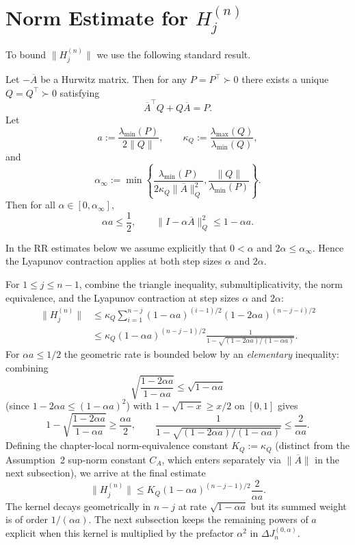 \section{\texorpdfstring{Norm Estimate for $H_j^{(n)}$}{Norm Estimate for H}}

To bound $\lVert H_j^{(n)}\rVert$ we use the following standard result.

\begin{lemma}
  \label{lem:lyapunov-contraction-local}
  Let $-\overline{A}$ be a Hurwitz matrix. Then for any
  $P=P^\top\succ0$ there exists a unique $Q=Q^\top\succ0$ satisfying
  \[
    \overline{A}^\top Q+Q\overline{A}=P.
  \]
  Let
  \[
    a:=\frac{\lambda_{\min}(P)}{2\lVert Q\rVert},
    \qquad
    \kappa_Q:=\frac{\lambda_{\max}(Q)}{\lambda_{\min}(Q)},
  \]
  and
  \[
    \alpha_\infty
      :=\min\left\{
        \frac{\lambda_{\min}(P)}
             {2\kappa_Q\lVert\overline{A}\rVert_Q^2},
        \frac{\lVert Q\rVert}{\lambda_{\min}(P)}
      \right\}.
  \]
  Then for all $\alpha\in[0,\alpha_\infty]$,
  \[
    \alpha a\leq\frac12,
    \qquad
    \lVert I-\alpha\overline{A}\rVert_Q^2\leq1-\alpha a.
  \]
\end{lemma}

In the RR estimates below we assume explicitly that $0<\alpha$ and
$2\alpha\leq\alpha_\infty$. Hence the Lyapunov contraction applies at both
step sizes $\alpha$ and $2\alpha$.

For $1\leq j\leq n-1$, combine the triangle inequality,
submultiplicativity, the norm equivalence, and the Lyapunov contraction at step
sizes $\alpha$ and $2\alpha$:
\[
  \begin{aligned}
    \lVert H_j^{(n)}\rVert
      &\leq\kappa_Q\sum_{i=1}^{n-j}
        (1-\alpha a)^{(i-1)/2}
        (1-2\alpha a)^{(n-j-i)/2} \\
      &\leq\kappa_Q(1-\alpha a)^{(n-j-1)/2}
        \frac{1}
        {1-\sqrt{(1-2\alpha a)/(1-\alpha a)}}.
  \end{aligned}
\]
For $\alpha a\leq1/2$ the geometric rate is bounded below by an
\emph{elementary} inequality: combining
\[
  \sqrt{\frac{1-2\alpha a}{1-\alpha a}}
    \leq\sqrt{1-\alpha a}
\]
(since $1-2\alpha a\leq(1-\alpha a)^2$) with
$1-\sqrt{1-x}\geq x/2$ on $[0,1]$ gives
\[
  1-\sqrt{\frac{1-2\alpha a}{1-\alpha a}}
    \geq\frac{\alpha a}{2},
  \qquad
  \frac{1}{1-\sqrt{(1-2\alpha a)/(1-\alpha a)}}
    \leq\frac{2}{\alpha a}.
\]
Defining the chapter-local norm-equivalence constant $K_Q:=\kappa_Q$
(distinct from the Assumption~2 sup-norm constant $C_A$, which enters
separately via $\lVert\overline{A}\rVert$ in the next subsection), we arrive
at the final estimate
\[
  \lVert H_j^{(n)}\rVert
    \leq K_Q(1-\alpha a)^{(n-j-1)/2}\frac{2}{\alpha a}.
\]
The kernel decays geometrically in $n-j$ at rate $\sqrt{1-\alpha a}$ but its
summed weight is of order $1/(\alpha a)$. The next subsection keeps the
remaining powers of $a$ explicit when this kernel is multiplied by the
prefactor $\alpha^2$ in $\Delta J_n^{(0,\alpha)}$.
